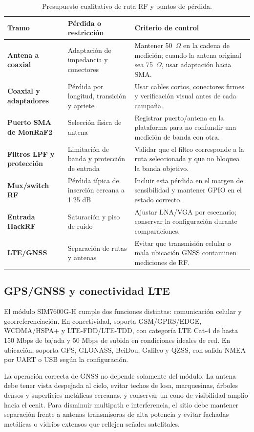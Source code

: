 \begin{table}[H]
\centering
\caption{Presupuesto cualitativo de ruta RF y puntos de pérdida.}
\label{tab:hw_rf_budget}
\begin{tabularx}{\textwidth}{>{\bfseries}p{3.2cm} p{3cm} X}
\toprule
Tramo & Pérdida o restricción & Criterio de control \\
\midrule
Antena a coaxial & Adaptación de impedancia y conectores & Mantener 50~$\Omega$ en la cadena de medición; cuando la antena original sea 75~$\Omega$, usar adaptación hacia SMA. \\
Coaxial y adaptadores & Pérdida por longitud, transición y apriete & Usar cables cortos, conectores firmes y verificación visual antes de cada campaña. \\
Puerto SMA de MonRaF2 & Selección física de antena & Registrar puerto/antena en la plataforma para no confundir una medición de banda con otra. \\
Filtros LPF y protección & Limitación de banda y protección de entrada & Validar que el filtro corresponde a la ruta seleccionada y que no bloquea la banda objetivo. \\
Mux/switch RF & Pérdida típica de inserción cercana a 1.25 dB & Incluir esta pérdida en el margen de sensibilidad y mantener GPIO en el estado correcto. \\
Entrada HackRF & Saturación y piso de ruido & Ajustar LNA/VGA por escenario; conservar la configuración durante comparaciones. \\
LTE/GNSS & Separación de rutas y antenas & Evitar que transmisión celular o mala ubicación GNSS contaminen mediciones de RF. \\
\bottomrule
\end{tabularx}
\end{table}

\subsection{GPS/GNSS y conectividad LTE}

El módulo SIM7600G-H cumple dos funciones distintas: comunicación celular y
georreferenciación. En conectividad, soporta GSM/GPRS/EDGE, WCDMA/HSPA+ y
LTE-FDD/LTE-TDD, con categoría LTE Cat-4 de hasta 150 Mbps de bajada y
50 Mbps de subida en condiciones ideales de red. En ubicación, soporta GPS,
GLONASS, BeiDou, Galileo y QZSS, con salida NMEA por UART o USB según la
configuración.

La operación correcta de GNSS no depende solamente del módulo. La antena debe
tener vista despejada al cielo, evitar techos de losa, marquesinas, árboles
densos y superficies metálicas cercanas, y conservar un cono de visibilidad
amplio hacia el cenit. Para disminuir multipath e interferencia, el sitio debe
mantener separación frente a antenas transmisoras de alta potencia y evitar
fachadas metálicas o vidrios extensos que reflejen señales satelitales.

